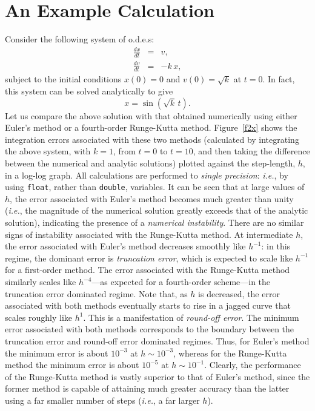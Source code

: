\section{An Example Calculation}
Consider the following system of o.d.e.s:
\begin{eqnarray}
\frac{dx}{dt} &=& v,\\[0.5ex]
\frac{dv}{dt}&=& -k\,x,
\end{eqnarray}
subject to the initial conditions $x(0)=0$ and $v(0) = \sqrt{k}$ at $t=0$. In fact,
this system can be solved analytically to give
\begin{equation}
x = \sin(\sqrt{k}\,t).
\end{equation}
Let us compare the above solution with that obtained numerically using either Euler's method
or a fourth-order Runge-Kutta method. Figure~\ref{f2x} shows the integration errors
associated with these two methods (calculated by integrating the above system, with $k=1$,
from $t=0$ to $t=10$, and then taking the difference between the numerical and analytic
solutions) plotted against the step-length, $h$, in a log-log graph. All calculations
are performed to {\em single precision}: {\em i.e.}, by using {\tt float}, rather
than {\tt double}, variables. It can be seen that at large values of $h$, the error associated
with Euler's method becomes much greater than unity ({\em i.e.}, the magnitude of the
numerical solution greatly exceeds that of the analytic solution), indicating the
presence of a {\em numerical instability}. There are no similar signs of  instability
 associated with the Runge-Kutta method. At intermediate $h$, the
error associated with Euler's method decreases smoothly like $h^{-1}$: in this regime, the
dominant error is {\em truncation error}, which is expected to scale like $h^{-1}$ for a first-order
method. The error associated with the Runge-Kutta method similarly scales like $h^{-4}$---as
 expected for a fourth-order scheme---in the
truncation error dominated regime. Note that, as $h$ is decreased,  the error associated with both
methods eventually starts to rise in a jagged curve that scales roughly like $h^1$. This
is a manifestation of {\em round-off error}. The minimum error associated with both methods
corresponds to the boundary between the truncation error and round-off error dominated
regimes. Thus, for Euler's method the minimum error is about $10^{-3}$ at $h\sim 10^{-3}$,
whereas for the Runge-Kutta method the minimum error is about $10^{-5}$ at $h\sim 10^{-1}$.
Clearly, the performance of the Runge-Kutta method is vastly superior to that of Euler's method,
since the former method is capable of attaining much greater accuracy  than the latter
using a far smaller number
of steps ({\em i.e.}, a far larger $h$).

